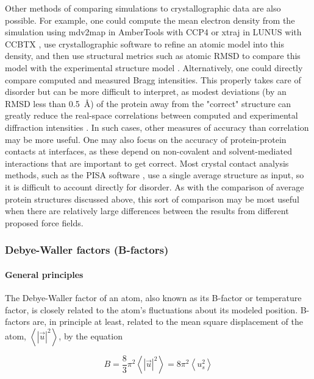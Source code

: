 \documentclass[9pt,review,pubversion]{livecoms}
\begin{document}
Other methods of comparing simulations to crystallographic data are also possible.
For example, one could compute the mean electron density from the simulation using mdv2map in AmberTools with CCP4 \cite{winn_overview_2011,case_amber_2022} or xtraj in LUNUS with CCBTX \cite{grosse-kunstleve_computational_2002,wall_methods_2009}, use crystallographic software to refine an atomic model into this density, and then use structural metrics such as atomic RMSD to compare this model with the experimental structure model \cite{wych_molecular-dynamics_2023}.
Alternatively, one could directly compare computed and measured Bragg intensities.
This properly takes care of disorder but can be more difficult to interpret, as modest deviations (by an RMSD less than \qty{0.5}{\angstrom}) of the protein away from the "correct" structure can greatly reduce the real-space correlations between computed and experimental diffraction intensities \cite{wall_internal_2018}.
In such cases, other measures of accuracy than correlation may be more useful.
One may also focus on the accuracy of protein-protein contacts at interfaces, as these depend on non-covalent and solvent-mediated interactions that are important to get correct.
Most crystal contact analysis methods, such as the PISA software \cite{krissinel_inference_2007}, use a single average structure as input, so it is difficult to account directly for disorder.
As with the comparison of average protein structures discussed above, this sort of comparison may be most useful when there are relatively large differences between the results from different proposed force fields.

\subsubsection{Debye-Waller factors (B-factors)}
\label{sub2:b_factors}

\paragraph{General principles}

The Debye-Waller factor of an atom, also known as its B-factor or temperature factor, is closely related to the atom’s fluctuations about its modeled position.
B-factors are, in principle at least, related to the mean square displacement of the atom, $\left\langle \left| \vec{u} \right|^2 \right\rangle$, by the equation

\begin{equation}
\label{eqn:b_factor}
B = \frac {8} {3} \pi^2 \left\langle \left| \vec{u} \right|^2 \right\rangle = 8 \pi^2 \left\langle u_s^2 \right\rangle
\end{equation}
\end{document}
